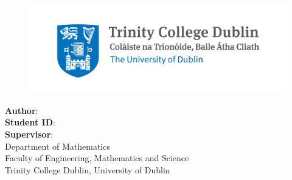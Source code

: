 \makeatletter
\begin{titlepage}
    \begin{center}
        \vspace*{1cm}

        \huge
        \textbf{\@title}

        \vspace{1cm}
        \LARGE
        \thesistype{}
        
		\vfill

        \begin{figure}[htbp]
             \centering
             \includegraphics[width=0.8\linewidth]{./Figures/tcd.jpg}
        \end{figure}
		
		\vfill

        \Large
        \textbf{Author}: \thesisauthor{} \\
        \textbf{Student ID}: \studentID{}\\
        \textbf{Supervisor}: \supervisor{}\\

        \vspace{1.5cm}
        Department of Mathematics\\
        Faculty of Engineering, Mathematics and Science\\
        Trinity College Dublin, University of Dublin\\

        \vspace{1cm}
        \@date

    \end{center}
\end{titlepage}
\makeatother